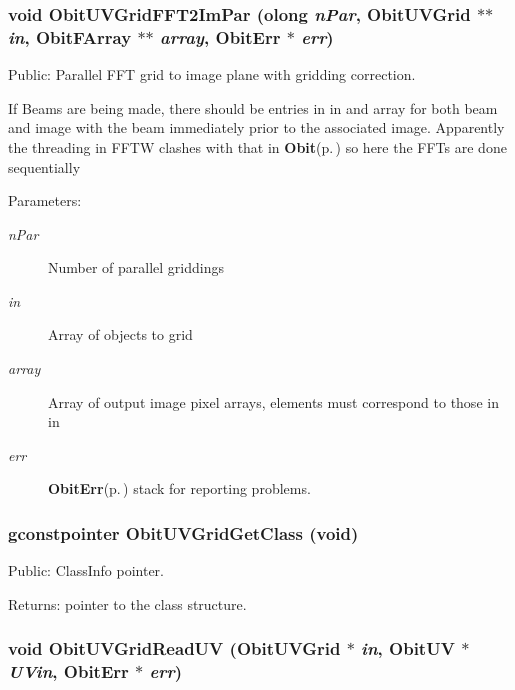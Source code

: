 \subsubsection{\setlength{\rightskip}{0pt plus 5cm}void Obit\-UVGrid\-FFT2Im\-Par ({\bf olong} {\em n\-Par}, {\bf Obit\-UVGrid} $\ast$$\ast$ {\em in}, {\bf Obit\-FArray} $\ast$$\ast$ {\em array}, {\bf Obit\-Err} $\ast$ {\em err})}\label{ObitUVGrid_8h_a15}


Public: Parallel FFT grid to image plane with gridding correction. 

If Beams are being made, there should be entries in in and array for both beam and image with the beam immediately prior to the associated image. Apparently the threading in FFTW clashes with that in {\bf Obit}{\rm (p.\,\pageref{structObit})} so here the FFTs are done sequentially \begin{Desc}
\item[Parameters:]
\begin{description}
\item[{\em n\-Par}]Number of parallel griddings \item[{\em in}]Array of objects to grid \item[{\em array}]Array of output image pixel arrays, elements must correspond to those in in \item[{\em err}]{\bf Obit\-Err}{\rm (p.\,\pageref{structObitErr})} stack for reporting problems. \end{description}
\end{Desc}
\subsubsection{\setlength{\rightskip}{0pt plus 5cm}gconstpointer Obit\-UVGrid\-Get\-Class (void)}\label{ObitUVGrid_8h_a10}


Public: Class\-Info pointer. 

\begin{Desc}
\item[Returns:]pointer to the class structure. \end{Desc}
\subsubsection{\setlength{\rightskip}{0pt plus 5cm}void Obit\-UVGrid\-Read\-UV ({\bf Obit\-UVGrid} $\ast$ {\em in}, {\bf Obit\-UV} $\ast$ {\em UVin}, {\bf Obit\-Err} $\ast$ {\em err})}\label{ObitUVGrid_8h_a12}


